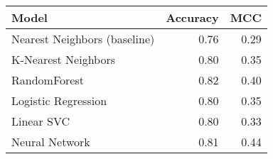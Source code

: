 \begin{tabular}{lrr}
\toprule
\textbf{Model}      & \textbf{Accuracy} & \textbf{MCC}  \\
\midrule
Nearest Neighbors (baseline)   & 0.76              & 0.29          \\     
K-Nearest Neighbors & 0.80              & 0.35          \\
RandomForest        & 0.82              & 0.40          \\
Logistic Regression & 0.80              & 0.35          \\
Linear SVC          & 0.80              & 0.33          \\
Neural Network      & 0.81              & 0.44          \\
\bottomrule
\end{tabular}
